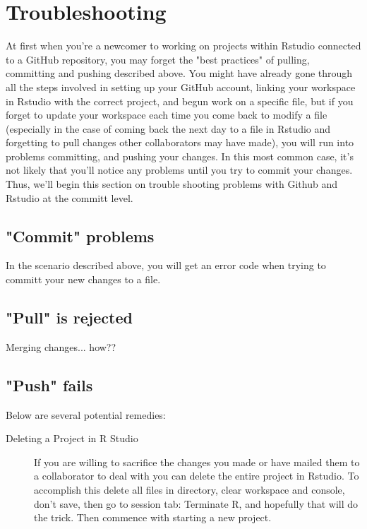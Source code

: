 \documentclass{article}
\begin{document}
\section{Troubleshooting}
At first when you're a newcomer to working on projects within Rstudio connected to a GitHub repository, you may forget the "best practices" of pulling, committing and pushing described above. You might have already gone through all the steps involved in setting up your GitHub account, linking your workspace in Rstudio with the correct project, and begun work on a specific file, but if you forget to update your workspace each time you come back to modify a file (especially in the case of coming back the next day to a file in Rstudio and forgetting to pull changes other collaborators may have made), you will run into problems committing, and pushing your changes. In this most common case, it's not likely that you'll notice any problems until you try to commit your changes. Thus, we'll begin this section on trouble shooting problems with Github and Rstudio at the committ level.

\subsection{"Commit" problems}
In the scenario described above, you will get an error code when trying to committ your new changes to a file. 

\subsection{"Pull" is rejected}

Merging changes... how??
\subsection{"Push" fails}

Below are several potential remedies:

\begin{description}
  \item[Deleting a Project in R Studio]If you are willing to sacrifice the changes you made or have mailed them to a collaborator to deal with you can delete the entire project in Rstudio. To accomplish this delete all files in directory, clear workspace and console, don't save, then go to session tab: Terminate R, and hopefully that will do the trick. Then commence with starting a new project. 

\end{description}
\end{document}
